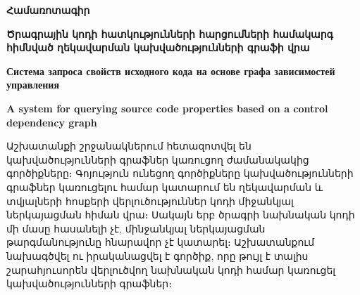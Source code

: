 {
	\thispagestyle{plain}
	\begin{center}
		\large
		\textbf{Համառոտագիր}
	\end{center}

	\begin{center}
		\vspace{0.5cm}

		\large
		\textbf{Ծրագրային կոդի հատկությունների հարցումների համակարգ հիմնված ղեկավարման կախվածությունների գրաֆի վրա}

		\vspace{0.2cm}
		\textbf{Система запроса свойств исходного кода на основе графа зависимостей управления}

		\vspace{0.2cm}
		\textbf{A system for querying source code properties based on a control dependency graph}

		\vspace{0.5cm}

	\end{center}
	Աշխատանքի շրջանակներում հետազոտվել են կախվածությունների գրաֆներ կառուցող ժամանակակից գործիքները։ Գոյություն ունեցող գործիքները կախվածությունների գրաֆներ կառուցելու համար կատարում են ղեկավարման և տվյալների հոսքերի վերլուծություններ կոդի միջանկյալ ներկայացման հիման վրա։ Սակայն երբ ծրագրի նախնական կոդի մի մասը հասանելի չէ, մինջանկյալ ներկայացման թարգմանությունը հնարավոր չէ կատարել։ Աշխատանքում նախագծվել ու իրականացվել է գործիք, որը թույլ է տալիս շարահյուսորեն վերլուծվող նախնական կոդի համար կառուցել կախվածությունների գրաֆներ։
}